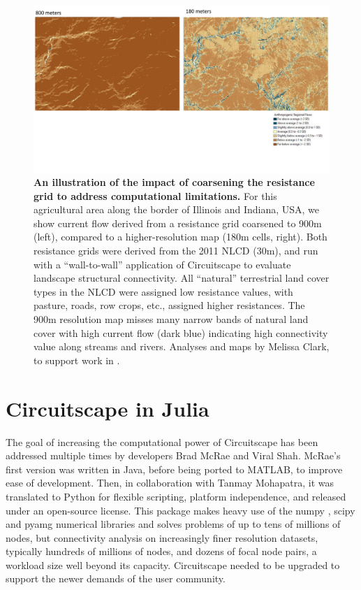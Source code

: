 \documentclass{juliacon}
\begin{document}
\begin{figure}
    \centering
    \includegraphics[width=\textwidth]{res.pdf}
    \caption{\textbf{An illustration of the impact of coarsening the resistance grid to address computational limitations.}  For this agricultural area along the border of Illinois and Indiana, USA, we show current flow derived from a resistance grid coarsened to 900m (left), compared to a higher-resolution map (180m cells, right).  Both resistance grids were derived from the 2011 NLCD (30m), and run with a “wall-to-wall” application of Circuitscape to evaluate landscape structural connectivity.  All “natural” terrestrial land cover types in the NLCD were assigned low resistance values, with pasture, roads, row crops, etc., assigned higher resistances. The 900m resolution map misses many narrow bands of natural land cover with high current flow (dark blue) indicating high connectivity value along streams and rivers. Analyses and maps by Melissa Clark, to support work in \cite{baldwin2018future}. 
}
    \label{fig:my_label}
\end{figure}



\section{Circuitscape in Julia}
\label{sec:documentclass}
%
The goal of increasing the computational power of Circuitscape has been addressed multiple times by developers Brad McRae and Viral Shah.  McRae’s first version was written in Java, before being ported to MATLAB, to improve ease of development. Then, in collaboration with Tanmay Mohapatra, it was translated to Python for flexible scripting, platform independence, and released under an open-source license. This package makes heavy use of the numpy \cite{van2011numpy}, scipy \cite{jones2014scipy} and pyamg \cite{bell2015pyamg} numerical libraries and solves problems of up to tens of millions of nodes, but connectivity analysis on increasingly finer resolution datasets, typically hundreds of millions of nodes, and dozens of focal node pairs, a workload size well beyond its capacity. Circuitscape needed to be upgraded to support the newer demands of the user community. 
\end{document}
